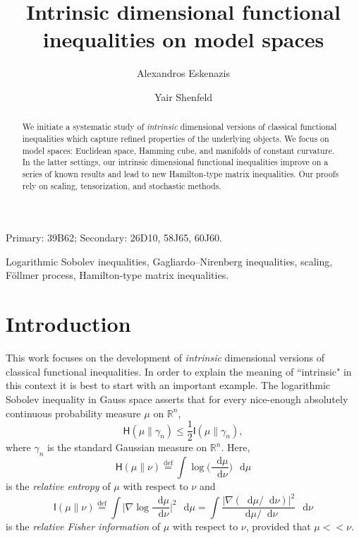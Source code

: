 \documentclass[a4paper,twoside,11pt,reqno]{amsart}
\title{Intrinsic dimensional functional inequalities on model spaces}
\author{Alexandros Eskenazis}
\author{Yair Shenfeld}
\newcommand{\eqdef}{\stackrel{\mathrm{def}}{=}}
\newcommand*\diff{\mathop{}\!\mathrm{d}}
\newcommand{\R}{\mathbb{R}} %
\newcommand{\II}{\mathsf{I}}
\newcommand{\HH}{\mathsf{H}}
\begin{document}
\maketitle
\vspace{-3mm}

\begin{abstract}
We initiate a systematic study of \emph{intrinsic} dimensional versions of classical functional inequalities which capture refined properties of the underlying objects. We focus on  model spaces: Euclidean space, Hamming cube, and manifolds of constant curvature. In the latter settings, our intrinsic dimensional functional inequalities improve on a series of known results and lead to new Hamilton-type matrix inequalities. Our proofs rely on scaling, tensorization, and stochastic methods.
\end{abstract}


\bigskip

{\footnotesize
{} Primary: 39B62; Secondary: 26D10, 58J65, 60J60.

 Logarithmic Sobolev inequalities, Gagliardo--Nirenberg inequalities, scaling, F\"ollmer process, Hamilton-type matrix inequalities.}

\setcounter{tocdepth}{1}
\tableofcontents


\section{Introduction}
This work focuses on the development of \emph{intrinsic} dimensional versions of classical functional inequalities. In order to explain the meaning of ``intrinsic" in this context it is best to start with an important example. The logarithmic Sobolev inequality in Gauss space \cite{Sta59, Gro75} asserts that for every nice-enough absolutely continuous probability measure $\mu$ on $\R^n$,
\begin{equation} \label{eq:lsi-gross}
\HH(\mu\|\gamma_n) \leq\frac{1}{2} \II(\mu\|\gamma_n),
\end{equation}
where $\gamma_n$ is the standard Gaussian measure on $\R^n$. Here,
\begin{equation}
\HH(\mu\|\nu) \eqdef \int \log\Big(\frac{\diff \mu}{\diff \nu}\Big) \,\diff \mu 
\end{equation}
is the \emph{relative entropy} of $\mu$ with respect to $\nu$ and 
\begin{equation}
\II(\mu\|\nu) \eqdef \int \Big| \nabla\log\frac{\diff\mu}{\diff\nu} \Big|^2 \,\diff\mu = \int \frac{|\nabla (\diff\mu/\diff\nu)|^2}{\diff\mu/\diff\nu} \,\diff\nu
\end{equation}
is the \emph{relative Fisher information} of $\mu$ with respect to $\nu$, provided that $\mu<\!\!\!<\nu$.
\end{document}
